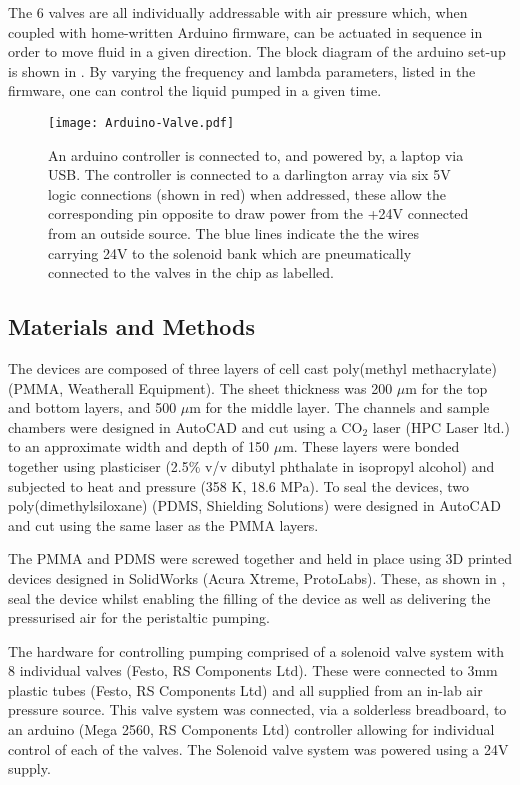 The 6 valves are all individually addressable with air pressure which, when
coupled with home-written Arduino firmware, can be actuated in sequence in order to move
fluid in a given direction. The block diagram of the arduino set-up is shown in
. By varying the frequency and lambda parameters, listed in the
firmware, one can control the liquid pumped in a given time.

\begin{figure}[ht]
  \begin{center}
  \texttt{[image: Arduino-Valve.pdf]}
  \end{center}
  \caption{An arduino controller is connected to, and powered by, a laptop via USB. The controller is connected
  to a darlington array via six 5V logic connections (shown in red) when addressed, these allow the corresponding pin
  opposite to draw power from the +24V connected from an outside source. The blue lines indicate the the wires
  carrying 24V to the solenoid bank which are pneumatically connected to the valves in the chip as labelled. }
  \label{fig:ValveSetup}
\end{figure}

\newpage

\subsection{Materials and Methods}

The devices are composed of three layers of cell cast poly(methyl methacrylate) (PMMA,
Weatherall Equipment). The sheet thickness was 200 $\mu$m for the top and bottom layers, and 500 $\mu$m for
the middle layer. The channels and sample chambers were designed in
AutoCAD and cut using a CO$_2$ laser (HPC Laser ltd.) to an approximate width and depth
of 150 $\mu$m. These layers were bonded together using plasticiser (2.5\% v/v dibutyl
phthalate in isopropyl alcohol) and subjected to heat and pressure (358 K, 18.6 MPa).
To seal the devices, two poly(dimethylsiloxane) (PDMS, Shielding Solutions) were
designed in AutoCAD and cut using the same laser as the PMMA layers.

The PMMA and PDMS were screwed together and held in place using 3D printed devices
designed in SolidWorks (Acura Xtreme, ProtoLabs). These, as shown in , seal the
device whilst enabling the filling of the device as well as delivering the pressurised
air for the peristaltic pumping.

The hardware for controlling pumping comprised of a solenoid valve system with 8
individual valves (Festo, RS Components Ltd). These were connected to 3mm plastic tubes
(Festo, RS Components Ltd) and all supplied from an in-lab air pressure source. This valve system was connected,
via a solderless breadboard, to an arduino (Mega 2560, RS Components Ltd) controller allowing for
individual control of each of the valves. The Solenoid valve system was powered using
a 24V supply.

